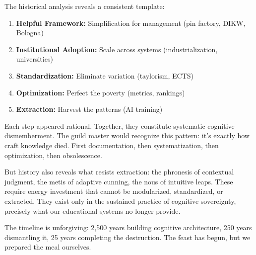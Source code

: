 The historical analysis reveals a consistent template:

\begin{enumerate}
\item \textbf{Helpful Framework:} Simplification for management (pin factory, DIKW, Bologna)
\item \textbf{Institutional Adoption:} Scale across systems (industrialization, universities)
\item \textbf{Standardization:} Eliminate variation (taylorism, ECTS)
\item \textbf{Optimization:} Perfect the poverty (metrics, rankings)
\item \textbf{Extraction:} Harvest the patterns (AI training)
\end{enumerate}

Each step appeared rational. Together, they constitute systematic cognitive dismemberment. The guild master would recognize this pattern: it's exactly how craft knowledge died. First documentation, then systematization, then optimization, then obsolescence.

But history also reveals what resists extraction: the phronesis of contextual judgment, the metis of adaptive cunning, the nous of intuitive leaps. These require energy investment that cannot be modularized, standardized, or extracted. They exist only in the sustained practice of cognitive sovereignty, precisely what our educational systems no longer provide.

The timeline is unforgiving: 2,500 years building cognitive architecture, 250 years dismantling it, 25 years completing the destruction. The feast has begun, but we prepared the meal ourselves.

